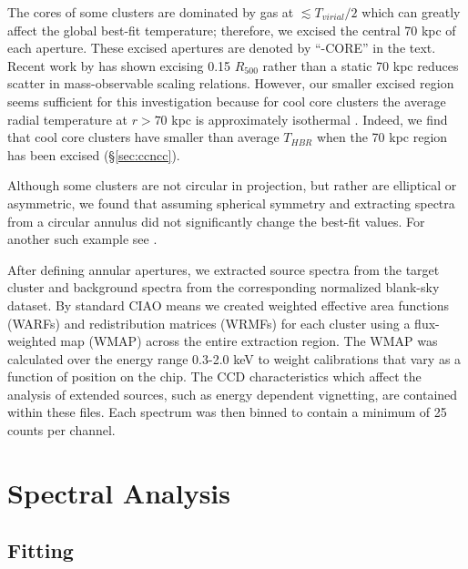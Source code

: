 \documentclass[12pt,preprint]{aastex}
\begin{document}
The cores of some clusters are dominated by gas at $\lesssim
T_{virial}/2$ which can greatly affect the global best-fit
temperature; therefore, we excised the central 70 kpc of each
aperture. These excised apertures are denoted by ``-CORE'' in the
text. Recent work by \cite{2007astro.ph..3504M} has shown excising
0.15 $R_{500}$ rather than a static 70 kpc reduces scatter in
mass-observable scaling relations. However, our smaller excised region
seems sufficient for this investigation because for cool core clusters
the average radial temperature at $r > 70$ kpc is approximately
isothermal \citep{2005ApJ...628..655V}. Indeed, we find that cool core
clusters have smaller than average $T_{HBR}$ when the 70 kpc region
has been excised (\S\ref{sec:ccncc}).

Although some clusters are not circular in projection, but rather are
elliptical or asymmetric, we found that assuming spherical symmetry
and extracting spectra from a circular annulus did not significantly
change the best-fit values. For another such example see
\cite{2005MNRAS.359.1481B}.

After defining annular apertures, we extracted source spectra from the
target cluster and background spectra from the corresponding
normalized blank-sky dataset. By standard {\textsc{CIAO}} means we
created weighted effective area functions (WARFs) and redistribution
matrices (WRMFs) for each cluster using a flux-weighted map (WMAP)
across the entire extraction region. The WMAP was calculated over the
energy range 0.3-2.0 keV to weight calibrations that vary as a
function of position on the chip. The CCD characteristics which affect
the analysis of extended sources, such as energy dependent vignetting,
are contained within these files. Each spectrum was then binned to
contain a minimum of 25 counts per channel.

\section{Spectral Analysis} \label{sec:specan}

\subsection{Fitting} \label{sec:fitting}
\end{document}
